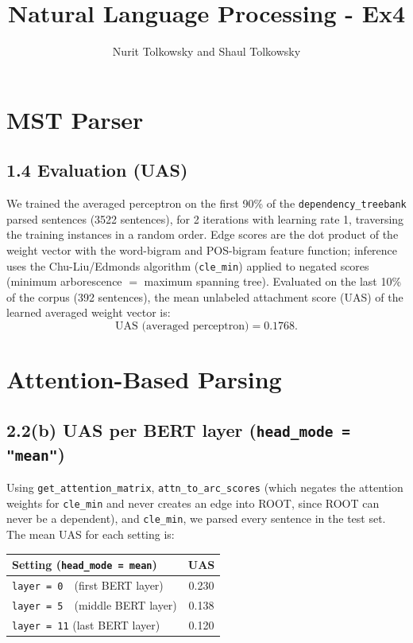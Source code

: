 \documentclass[11pt]{article}
\title{Natural Language Processing - Ex4}
\author{Nurit Tolkowsky and Shaul Tolkowsky}
\date{}
\begin{document}
\maketitle

\section{MST Parser}

\subsection*{1.4 \quad Evaluation (UAS)}

We trained the averaged perceptron on the first 90\% of the
\texttt{dependency\_treebank} parsed sentences (3522 sentences), for 2
iterations with learning rate 1, traversing the training instances in a
random order. Edge scores are the dot product of the weight vector with the
word-bigram and POS-bigram feature function; inference uses the
Chu-Liu/Edmonds algorithm (\texttt{cle\_min}) applied to negated scores
(minimum arborescence $=$ maximum spanning tree). Evaluated on the last 10\%
of the corpus (392 sentences), the mean unlabeled attachment score (UAS) of
the learned averaged weight vector is:
\[
  \text{UAS (averaged perceptron)} = 0.1768 .
\]

\section{Attention-Based Parsing}

\subsection*{2.2(b) \quad UAS per BERT layer (\texttt{head\_mode = "mean"})}

Using \texttt{get\_attention\_matrix}, \texttt{attn\_to\_arc\_scores} (which
negates the attention weights for \texttt{cle\_min} and never creates an edge
into ROOT, since ROOT can never be a dependent), and \texttt{cle\_min}, we
parsed every sentence in the test set. The mean UAS for each setting is:

\begin{center}
\begin{tabular}{lc}
\toprule
Setting (\texttt{head\_mode = mean}) & UAS \\
\midrule
\texttt{layer = 0}\ \ (first BERT layer)  & 0.230 \\
\texttt{layer = 5}\ \ (middle BERT layer) & 0.138 \\
\texttt{layer = 11} (last BERT layer)     & 0.120 \\
\bottomrule
\end{tabular}
\end{center}
\end{document}
